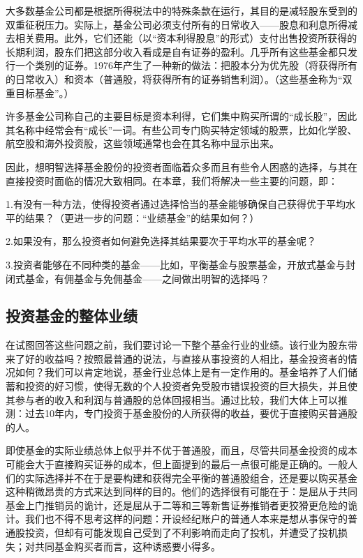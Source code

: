 \documentclass[12pt,oneside]{book}
\begin{document}
大多数基金公司都是根据所得税法中的特殊条款在运行，其目的是减轻股东受到的双重征税压力。实际上，基金公司必须支付所有的日常收入——股息和利息所得减去相关费用。此外，它们还能（以“资本利得股息”的形式）支付出售投资所获得的长期利润，股东们把这部分收入看成是自有证券的盈利。几乎所有这些基金都只发行一个类别的证券。1976年产生了一种新的做法：把股本分为优先股（将获得所有的日常收入）和资本（普通股，将获得所有的证券销售利润）。（这些基金称为“双重目标基金”。）

许多基金公司称自己的主要目标是资本利得，它们集中购买所谓的“成长股”，因此其名称中经常会有“成长”一词。有些公司专门购买特定领域的股票，比如化学股、航空股和海外投资股，这些领域通常也会在其名称中显示出来。

因此，想明智选择基金股份的投资者面临着众多而且有些令人困惑的选择，与其在直接投资时面临的情况大致相同。在本章，我们将解决一些主要的问题，即：

1.有没有一种方法，使得投资者通过选择恰当的基金能够确保自己获得优于平均水平的结果？（更进一步的问题：“业绩基金”的结果如何？）

2.如果没有，那么投资者如何避免选择其结果要次于平均水平的基金呢？

3.投资者能够在不同种类的基金——比如，平衡基金与股票基金，开放式基金与封闭式基金，有佣基金与免佣基金——之间做出明智的选择吗？


\subsection{投资基金的整体业绩}
在试图回答这些问题之前，我们要讨论一下整个基金行业的业绩。该行业为股东带来了好的收益吗？按照最普通的说法，与直接从事投资的人相比，基金投资者的情况如何？我们可以肯定地说，基金行业总体上是有一定作用的。基金培养了人们储蓄和投资的好习惯，使得无数的个人投资者免受股市错误投资的巨大损失，并且使其参与者的收入和利润与普通股的总体回报相当。通过比较，我们大体上可以推测：过去10年内，专门投资于基金股份的人所获得的收益，要优于直接购买普通股的人。

即使基金的实际业绩总体上似乎并不优于普通股，而且，尽管共同基金投资的成本可能会大于直接购买证券的成本，但上面提到的最后一点很可能是正确的。一般人们的实际选择并不在于是要构建和获得完全平衡的普通股组合，还是要以购买基金这种稍微昂贵的方式来达到同样的目的。他们的选择很有可能在于：是屈从于共同基金上门推销员的诡计，还是屈从于二等和三等新售证券推销者更狡猾更危险的诡计。我们也不得不思考这样的问题：开设经纪账户的普通人本来是想从事保守的普通股投资，但却有可能发现自己受到了不利影响而走向了投机，并遭受了投机损失；对共同基金购买者而言，这种诱惑要小得多。
\end{document}
